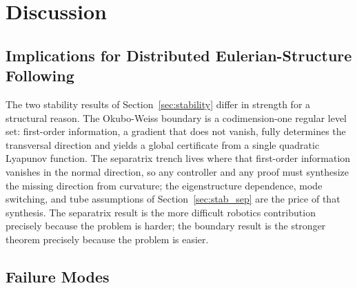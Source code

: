 \documentclass[lettersize,journal]{IEEEtran}
\begin{document}


\section{Discussion}
\label{sec:discussion}

\subsection{Implications for Distributed Eulerian-Structure Following}

The two stability results of Section~\ref{sec:stability} differ in
strength for a structural reason. The Okubo-Weiss boundary is a
codimension-one regular level set: first-order information, a gradient
that does not vanish, fully determines the transversal direction and
yields a global certificate from a single quadratic Lyapunov function.
The separatrix trench lives where that first-order information vanishes
in the normal direction, so any controller and any proof must
synthesize the missing direction from curvature; the eigenstructure
dependence, mode switching, and tube assumptions of
Section~\ref{sec:stab_sep} are the price of that synthesis. The
separatrix result is the more difficult robotics contribution precisely
because the problem is harder; the boundary result is the stronger
theorem precisely because the problem is easier.


\subsection{Failure Modes}

\end{document}
